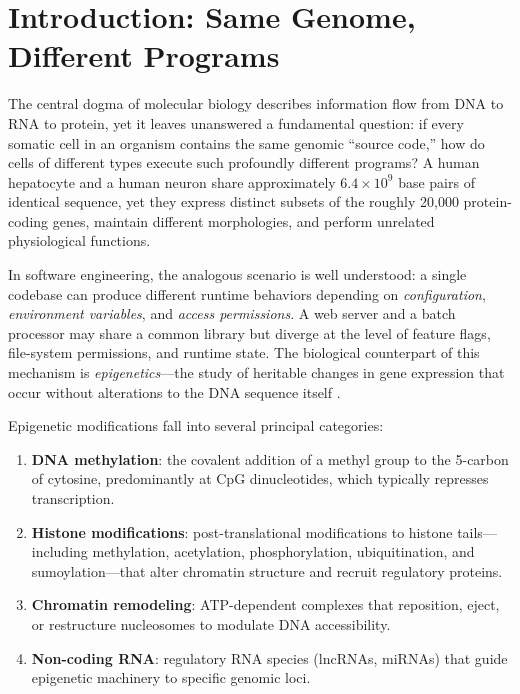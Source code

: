 \documentclass[12pt,a4paper]{article}
\begin{document}
\tableofcontents
\newpage

\section{Introduction: Same Genome, Different Programs}
\label{sec:intro}

The central dogma of molecular biology describes information flow from DNA to RNA to protein, yet it leaves unanswered a fundamental question: if every somatic cell in an organism contains the same genomic ``source code,'' how do cells of different types execute such profoundly different programs? A human hepatocyte and a human neuron share approximately $6.4 \times 10^9$ base pairs of identical sequence, yet they express distinct subsets of the roughly 20,000 protein-coding genes, maintain different morphologies, and perform unrelated physiological functions.

In software engineering, the analogous scenario is well understood: a single codebase can produce different runtime behaviors depending on \emph{configuration}, \emph{environment variables}, and \emph{access permissions}. A web server and a batch processor may share a common library but diverge at the level of feature flags, file-system permissions, and runtime state. The biological counterpart of this mechanism is \emph{epigenetics}---the study of heritable changes in gene expression that occur without alterations to the DNA sequence itself \cite{waddington1942,bird2007}.

Epigenetic modifications fall into several principal categories:
\begin{enumerate}[label=(\roman*)]
    \item \textbf{DNA methylation}: the covalent addition of a methyl group to the 5-carbon of cytosine, predominantly at CpG dinucleotides, which typically represses transcription.
    \item \textbf{Histone modifications}: post-translational modifications to histone tails---including methylation, acetylation, phosphorylation, ubiquitination, and sumoylation---that alter chromatin structure and recruit regulatory proteins.
    \item \textbf{Chromatin remodeling}: ATP-dependent complexes that reposition, eject, or restructure nucleosomes to modulate DNA accessibility.
    \item \textbf{Non-coding RNA}: regulatory RNA species (lncRNAs, miRNAs) that guide epigenetic machinery to specific genomic loci.
\end{enumerate}
\end{document}

